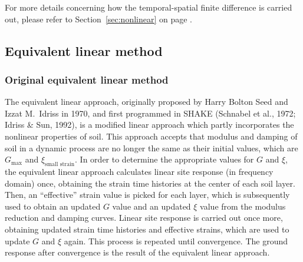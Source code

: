 \documentclass[11pt,letterpaper]{article}
\begin{document}
For more details concerning how the temporal-spatial finite difference is carried out, please refer to Section~\ref{sec:nonlinear} on page \pageref{sec:nonlinear}.


\subsection{Equivalent linear method}\label{sec:equivalent-linear}

\subsubsection{Original equivalent linear method}

The equivalent linear approach, originally proposed by Harry Bolton Seed and Izzat M.~Idriss in 1970, and first programmed in SHAKE (Schnabel et al., 1972; Idriss \& Sun, 1992), is a modified linear approach which partly incorporates the nonlinear properties of soil. This approach accepts that modulus and damping of soil in a dynamic process are no longer the same as their initial values, which are $G_{\text{max}}$ and $\xi_{\text{small strain}}$. In order to determine the appropriate values for $G$ and $\xi$, the equivalent linear approach calculates linear site response (in frequency domain) once, obtaining the strain time histories at the center of each soil layer. Then, an ``effective'' strain value is picked for each layer, which is subsequently used to obtain an updated $G$ value and an updated $\xi$ value from the modulus reduction and damping curves. Linear site response is carried out once more, obtaining updated strain time histories and effective strains, which are used to update $G$ and $\xi$ again.  This process is repeated until convergence. The ground response after convergence is the result of the equivalent linear approach.
\end{document}
